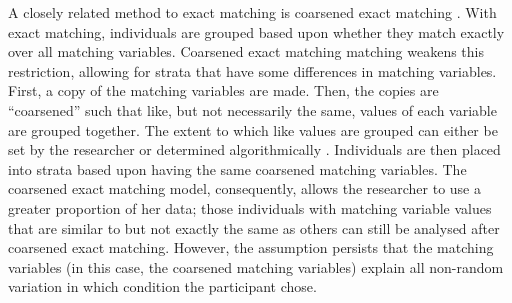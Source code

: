 \documentclass[12pt]{article}
\begin{document}
A closely related method to exact matching is coarsened exact matching \citep{iacusCemSoftwareCoarsened2009}. With exact matching, individuals are grouped based upon whether they match exactly over all matching variables. Coarsened exact matching matching weakens this restriction, allowing for strata that have some differences in matching variables. First, a copy of the matching variables are made. Then, the copies are ``coarsened'' such that like, but not necessarily the same, values of each variable are grouped together. The extent to which like values are grouped can either be set by the researcher or determined algorithmically \citep{blackwellCemCoarsenedExact2009}. Individuals are then placed into strata based upon having the same coarsened matching variables. The coarsened exact matching model, consequently, allows the researcher to use a greater proportion of her data; those individuals with matching variable values that are similar to but not exactly the same as others can still be analysed after coarsened exact matching. However, the assumption persists that the matching variables (in this case, the coarsened matching variables) explain all non-random variation in which condition the participant chose.
\end{document}
